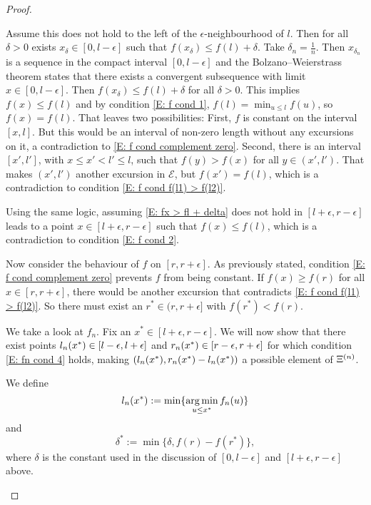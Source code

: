 \begin{proof}
\begin{proofpart}
Assume this does not hold to the left of the $\epsilon$-neighbourhood of $l$.
Then for all $\delta > 0$ exists $x_{\delta} \in [0, l - \epsilon]$ such that
$f(x_{\delta}) \leq f(l) + \delta$.
Take $\delta_n = \frac{1}{n}$. 
Then $x_{\delta_n}$ is a sequence in the compact interval $[0, l - \epsilon]$
and the Bolzano–Weierstrass theorem states that there exists a convergent subsequence with limit $x \in [0, l - \epsilon]$.
Then $f(x_{\delta}) \leq f(l) + \delta$ for all $\delta > 0$.
This implies $f(x) \leq f(l)$ and by condition \eqref{E: f cond 1},
$f(l) = \min_{u \leq l}f(u)$,
so $f(x) = f(l)$.
That leaves two possibilities:
First, $f$ is constant on the interval $[x,l]$.
But this would be an interval of non-zero length without any excursions on it,
a contradiction to \eqref{E: f cond complement zero}.
Second, there is an interval
$[x', l']$, with $x\leq x'<l' \leq l$,
such that $f(y) > f(x)$ for all $y \in (x',l')$.
That makes $(x',l')$ another excursion in $\mathcal{E}$,
but $f(x') = f(l)$,
which is a contradiction to condition \eqref{E: f cond f(l1) > f(l2)}.

Using the same logic,
assuming \eqref{E: fx > fl + delta} does not hold in $[l + \epsilon, r- \epsilon]$
leads to a point $x \in [l + \epsilon, r- \epsilon]$
such that $f(x) \leq f(l)$,
which is a contradiction to condition \eqref{E: f cond 2}.

Now consider the behaviour of $f$ on $[r, r + \epsilon]$.
As previously stated, 
condition \eqref{E: f cond complement zero} prevents $f$ from being constant.
If $f(x) \geq f(r)$ for all $x \in [r, r + \epsilon]$,
there would be another excursion that contradicts \eqref{E: f cond f(l1) > f(l2)}.
So there must exist an $r^* \in (r, r + \epsilon]$ with $f(r^*) < f(r)$.

\bigskip

We take a look at $f_n$.
Fix an $x^* \in [l+\epsilon, r-\epsilon]$.
We will now show that there exist points
$l_n(x^*) \in [l-\epsilon, l+\epsilon]$
and 
$r_n(x^*) \in [r-\epsilon, r+\epsilon]$
for which condition \eqref{E: fn cond 4} holds,
making $(l_n(x^*), r_n(x^*)- l_n(x^*))$ a possible element of $\Xi^{(n)}$.

We define 
\begin{equation} \label{D: lnx}
l_n(x^*) := \min\{\operatorname*{arg\,min}_{u \leq x^*} f_n(u)\}
\end{equation}
and 
\begin{equation} \label{D: delta star}
\delta^* := \min\{ \delta, f(r) - f(r^*) \},
\end{equation}
where $\delta$ is the constant used in the discussion of
$[0, l-\epsilon]$ and $[l+\epsilon, r-\epsilon]$ above.


\end{proofpart}
\end{proof}
